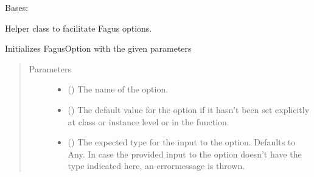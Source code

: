 \documentclass[a4paper,10pt,english]{sphinxmanual}
\begin{document}
\begin{fulllineitems}
\label{\detokenize{fagus.utils:fagus.utils.FagusOption}}
\pysigstartsignatures
{}
\pysigstopsignatures
\sphinxAtStartPar
Bases: 

\sphinxAtStartPar
Helper class to facilitate Fagus options.

\begin{fulllineitems}
\label{\detokenize{fagus.utils:fagus.utils.FagusOption.__init__}}
\pysigstartsignatures
{}
\pysigstopsignatures
\sphinxAtStartPar
Initializes FagusOption with the given parameters
\begin{quote}\begin{description}
\item[{Parameters}] \leavevmode\begin{itemize}
\item {}
\sphinxAtStartPar
{} () \textendash{} The name of the option.

\item {}
\sphinxAtStartPar
{} () \textendash{} The default value for the option if it hasn’t been set explicitly at class\sphinxhyphen{} or instance
level or in the function.

\item {}
\sphinxAtStartPar
{} () \textendash{} The expected type for the input to the option. Defaults to Any. In case the provided
input to the option doesn’t have the type indicated here, an error\sphinxhyphen{}message is thrown.


\end{itemize}
\end{description}
\end{quote}
\end{fulllineitems}
\end{fulllineitems}
\end{document}
